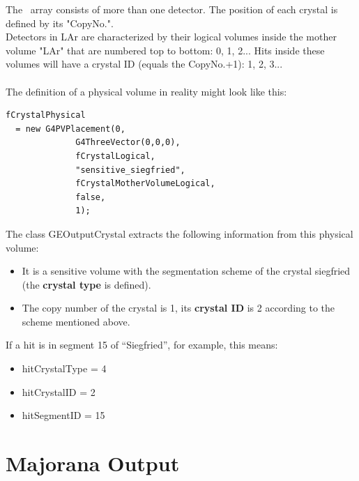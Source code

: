 The \gerda \ array consists of more than one detector. The position of each crystal is defined by its "CopyNo.".\\
Detectors in LAr are characterized by their logical volumes inside the mother volume "LAr" that are numbered top to bottom: 0, 1, 2... Hits inside these volumes will have a crystal ID (equals the CopyNo.+1): 1, 2, 3...\\
\vspace{0.2cm}\\
The definition of a physical volume in reality might look like this:
\begin{lstlisting}
fCrystalPhysical
  = new G4PVPlacement(0, 			     
		      G4ThreeVector(0,0,0),	     
		      fCrystalLogical,		     
		      "sensitive_siegfried",	     
		      fCrystalMotherVolumeLogical,   
		      false,			     
		      1);			     
\end{lstlisting}
The class GEOutputCrystal extracts the following information from this physical volume:\\
\begin{itemize}
\item It is a sensitive volume with the segmentation scheme of the crystal siegfried (the \textbf{crystal type }is defined).
\item The copy number of the crystal is 1, its \textbf{crystal ID} is 2 according to the scheme mentioned above.
\end{itemize}
If a hit is in segment 15 of ``Siegfried'', for example, this means:
\begin{itemize}
\item hitCrystalType = 4
\item hitCrystalID = 2
\item hitSegmentID = 15
\end{itemize}



\section{Majorana Output}
\label{IO_Majorana}
